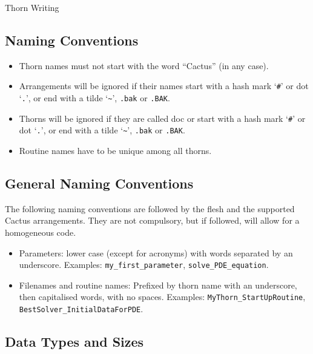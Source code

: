 \begin{cactuspart}{Thorn Writing}
\subsection{Naming Conventions}

\begin{itemize}

\item{} Thorn names must not start with the word ``Cactus'' (in
        any case).
\item{} Arrangements will be ignored if their names start with a
        hash mark `\texttt{\#}' or dot `\texttt{.}',
        or end with a tilde `\texttt{\~{}}', \texttt{.bak} or \texttt{.BAK}.
\item{} Thorns will be ignored if they are called doc or start with a
        hash mark `\texttt{\#}' or dot `\texttt{.}',
        or end with a tilde `\texttt{\~{}}', \texttt{.bak} or \texttt{.BAK}.
\item{} Routine names have to be unique among all thorns.

\end{itemize}


\subsection{General Naming Conventions}

The following naming conventions are followed by the flesh and the
supported Cactus arrangements. They are not compulsory, but if followed, will
allow for a homogeneous code.

\begin{itemize}

\item Parameters: lower case (except for acronyms) with words separated
  by an underscore. Examples: \texttt{my\_first\_parameter},
  \texttt{solve\_PDE\_equation}.

\item Filenames and routine names: Prefixed by thorn name with an underscore, then capitalised words, with no spaces.
    Examples: \texttt{MyThorn\_StartUpRoutine}, \texttt{BestSolver\_InitialDataForPDE}.

\end{itemize}


\subsection{Data Types and Sizes}
\label{sect-ThornWriting/DataTypes}
\label{sec:datyansi}


\end{cactuspart}
